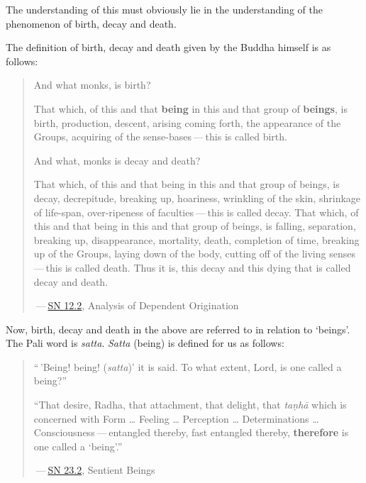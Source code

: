 The understanding of this must obviously lie in the understanding of the phenomenon of birth, decay and death.

The definition of birth, decay and death given by the Buddha himself is as follows:

\begin{quote}
And what monks, is birth?

That which, of this and that \textbf{being} in this and that group of \textbf{beings}, is birth, production, descent, arising coming forth, the appearance of the Groups, acquiring of the sense-bases --- this is called birth.

And what, monks is decay and death?

That which, of this and that being in this and that group of beings, is decay, decrepitude, breaking up, hoariness, wrinkling of the skin, shrinkage of life-span, over-ripeness of faculties --- this is called decay. That which, of this and that being in this and that group of beings, is falling, separation, breaking up, disappearance, mortality, death, completion of time, breaking up of the Groups, laying down of the body, cutting off of the living senses --- this is called death. Thus it is, this decay and this dying that is called decay and death.

 --- \href{https://suttacentral.net/sn12.2/en/bodhi}{SN 12.2}, Analysis of Dependent Origination
\end{quote}

Now, birth, decay and death in the above are referred to in relation to `beings'. The Pali word is \emph{satta}. \emph{Satta} (being) is defined for us as follows:

\begin{quote}
``\,'Being! being! (\emph{satta})' it is said. To what extent, Lord, is one called a being?''

``That desire, Radha, that attachment, that delight, that \emph{taṇhā} which is concerned with Form \ldots\hspace{0pt} Feeling \ldots\hspace{0pt} Perception \ldots\hspace{0pt} Determinations \ldots\hspace{0pt} Consciousness --- entangled thereby, fast entangled thereby, \textbf{therefore} is one called a `being'.''

 --- \href{https://suttacentral.net/sn23.2/en/sujato}{SN 23.2}, Sentient Beings
\end{quote}

